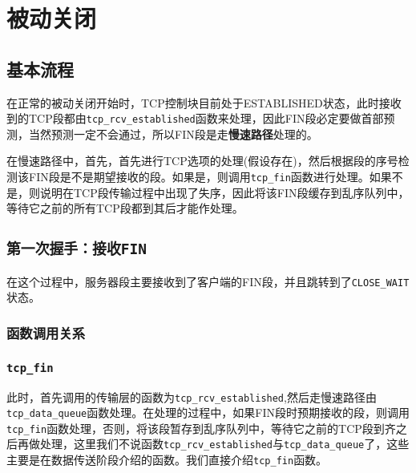 \section{被动关闭}
\label{sec:passive_close}

	\subsection{基本流程}
		在正常的被动关闭开始时，TCP控制块目前处于ESTABLISHED状态，此时接收到的TCP段都由\texttt{tcp_rcv_established}函数来处理，因此FIN段必定要做首部预测，当然预测一定不会通过，所以FIN段是走\textbf{慢速路径}处理的。

		在慢速路径中，首先，首先进行TCP选项的处理(假设存在)，然后根据段的序号检测该FIN段是不是期望接收的段。如果是，则调用\texttt{tcp_fin}函数进行处理。如果不是，则说明在TCP段传输过程中出现了失序，因此将该FIN段缓存到乱序队列中，等待它之前的所有TCP段都到其后才能作处理。

	\subsection{\texttt{第一次握手：接收FIN}}

		在这个过程中，服务器段主要接收到了客户端的FIN段，并且跳转到了\texttt{CLOSE_WAIT}状态。
		\subsubsection{函数调用关系}
		

		\subsubsection{\texttt{tcp_fin}}

			此时，首先调用的传输层的函数为\texttt{tcp_rcv_established},然后走慢速路径由\texttt{tcp_data_queue}函数处理。在处理的过程中，如果FIN段时预期接收的段，则调用\texttt{tcp_fin}函数处理，否则，将该段暂存到乱序队列中，等待它之前的TCP段到齐之后再做处理，这里我们不说函数\texttt{tcp_rcv_established}与\texttt{tcp_data_queue}了，这些主要是在数据传送阶段介绍的函数。我们直接介绍\texttt{tcp_fin}函数。

